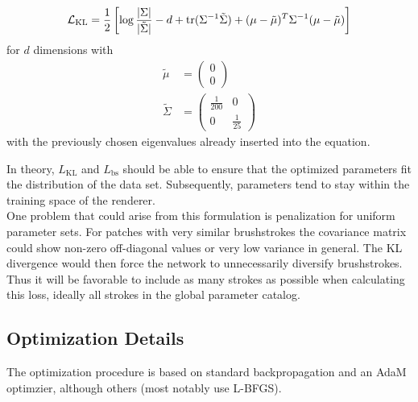 \begin{align}
    \mathcal{L}_{\text{KL}} = \frac{1}{2}\left[\log\frac{|\Sigma|}{|\tilde{\Sigma}|} - d + \text{tr} ( \Sigma^{-1}\tilde{\Sigma} ) + (\mu - \tilde{\mu})^T \Sigma^{-1}(\mu - \tilde{\mu})\right]
\end{align}
for $d$ dimensions with 
\begin{align}
    \tilde{\mu} & = \begin{pmatrix} 0 \\ 0 \end{pmatrix} \\
    \tilde{\Sigma} & = \begin{pmatrix} \frac{1}{200} & 0 \\ 0 & \frac{1}{25} \end{pmatrix}
\end{align}
with the previously chosen eigenvalues already inserted into the equation.

In theory, $L_{\text{KL}}$ and $L_{\text{bs}}$ should be able to ensure that the optimized parameters fit the distribution of the data set.
Subsequently, parameters tend to stay within the training space of the renderer.\\
One problem that could arise from this formulation is penalization for uniform parameter sets.
For patches with very similar brushstrokes the covariance matrix could show non-zero off-diagonal values or very low variance in general.
The KL divergence would then force the network to unnecessarily diversify brushstrokes.
Thus it will be favorable to include as many strokes as possible when calculating this loss, ideally all strokes in the global parameter catalog.

\subsection{Optimization Details}

The optimization procedure is based on standard backpropagation and an AdaM optimzier, although others (most notably \citeauthor*{gatys} use L-BFGS).

